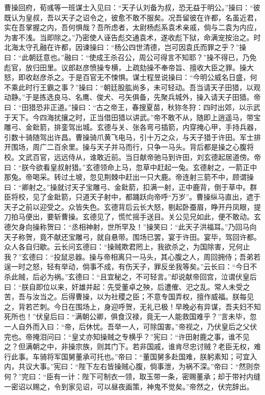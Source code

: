 曹操回府，荀彧等一班谋士入见曰：“天子认刘备为叔，恐无益于明公。”操曰：“彼既认为皇叔，吾以天子之诏令之，彼愈不敢不服矣。况吾留彼在许都，名虽近君，实在吾掌握之内，吾何惧哉？吾所虑者，太尉杨彪系袁术亲戚，倘与二袁为内应，为害不浅。当即除之。”乃密使人诬告彪交通袁术，遂收彪下狱，命满宠按治之。时北海太守孔融在许都，因谏操曰：“杨公四世清德，岂可因袁氏而罪之乎？”操曰：“此朝廷意也。”融曰：“使成王杀召公，周公可得言不知耶？”操不得已，乃免彪官，放归田里。议郎赵彦愤操专横，上疏劾操不奉帝旨、擅收大臣之罪。操大怒，即收赵彦杀之。于是百官无不悚惧。谋士程昱说操曰：“今明公威名日盛，何不乘此时行王霸之事？”操曰：“朝廷股肱尚多，未可轻动。吾当请天子田猎，以观动静。”于是拣选良马、名鹰、俊犬、弓矢俱备，先聚兵城外，操入请天子田猎。帝曰：“田猎恐非正道。”操曰：“古之帝王，春搜夏苗，秋狝冬狩：四时出郊，以示武于天下。今四海扰攘之时，正当借田猎以讲武。”帝不敢不从，随即上逍遥马，带宝雕弓、金鈚箭，排銮驾出城。玄德与关、张各弯弓插箭，内穿掩心甲，手持兵器，引数十骑随驾出许昌。曹操骑爪黄飞电马，引十万之众，与天子猎于许田。军士排开围场，周广二百余里。操与天子并马而行，只争一马头。背后都是操之心腹将校。文武百官，远远侍从，谁敢近前。当日献帝驰马到许田，刘玄德起居道傍。帝曰：“朕今欲看皇叔射猎。”玄德领命上马，忽草中赶起一兔。玄德射之，一箭正中那兔。帝喝采。转过土坡，忽见荆棘中赶出一只大鹿。帝连射三箭不中，顾谓操曰：“卿射之。”操就讨天子宝雕弓、金鈚箭，扣满一射，正中鹿背，倒于草中。群臣将校，见了金鈚箭，只道天子射中，都踊跃向帝呼“万岁”。曹操纵马直出，遮于天子之前以迎受之。众皆失色。玄德背后云长大怒，剔起卧蚕眉，睁开丹凤眼，提刀拍马便出，要斩曹操。玄德见了，慌忙摇手送目。关公见兄如此，便不敢动。玄德欠身向操称贺曰：“丞相神射，世所罕及！”操笑曰：“此天子洪福耳。”乃回马向天子称贺，竟不献还宝雕弓，就自悬带。围场已罢，宴于许田。宴毕，驾回许都。众人各自归歇。云长问玄德曰：“操贼欺君罔上，我欲杀之，为国除害，兄何止我？”玄德曰：“投鼠忌器。操与帝相离只一马头，其心腹之人，周回拥侍；吾弟若逞一时之怒，轻有举动，倘事不成，有伤天子，罪反坐我等矣。”云长曰：“今日不杀此贼，后必为祸。”玄德曰：“且宜秘之，不可轻言。”却说献帝回宫，泣谓伏皇后曰：“朕自即位以来，奸雄并起：先受董卓之殃，后遭傕、汜之乱。常人未受之苦，吾与汝当之。后得曹操，以为社稷之臣；不意专国弄权，擅作威福。朕每见之，背若芒刺。今日在围场上，身迎呼贺，无礼已极！早晚必有异谋，吾夫妇不知死所也！”伏皇后曰：“满朝公卿，俱食汉禄，竟无一人能救国难乎？”言未毕，忽一人自外而入曰：“帝，后休忧。吾举一人，可除国害。”帝视之，乃伏皇后之父伏完也。帝掩泪问曰：“皇丈亦知操贼之专横乎？”宪曰：“许田射鹿之事，谁不见之？但满朝之中，非操宗族，则其门下。若非国戚，谁肯尽忠讨贼？老臣无权，难行此事。车骑将军国舅董承可托也。”帝曰：“董国舅多赴国难，朕躬素知；可宜入内，共议大事。”宪曰：“陛下左右皆操贼心腹，倘事泄，为祸不深。”帝曰：“然则奈何？”完曰：“臣有一计：陛下可制衣一领，取玉带一条，密赐董承；却于带衬内缝一密诏以赐之，令到家见诏，可以昼夜画策，神鬼不觉矣。”帝然之，伏完辞出。

